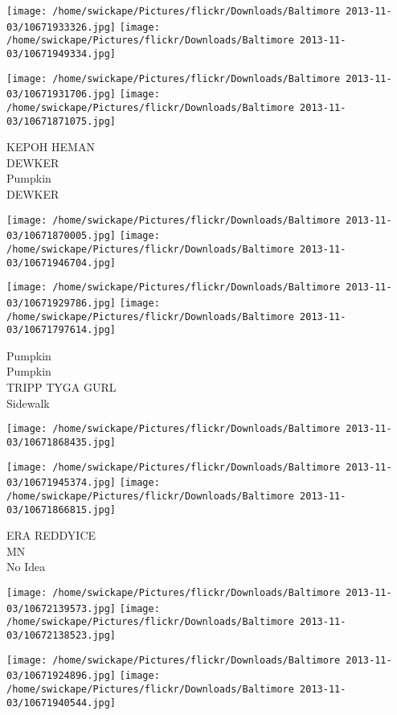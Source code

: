 \documentclass[10pt,letterpaper]{article}
\begin{document}
\texttt{[image: /home/swickape/Pictures/flickr/Downloads/Baltimore 2013-11-03/10671933326.jpg]}
\texttt{[image: /home/swickape/Pictures/flickr/Downloads/Baltimore 2013-11-03/10671949334.jpg]}

\texttt{[image: /home/swickape/Pictures/flickr/Downloads/Baltimore 2013-11-03/10671931706.jpg]}
\texttt{[image: /home/swickape/Pictures/flickr/Downloads/Baltimore 2013-11-03/10671871075.jpg]}

KEPOH HEMAN\\
DEWKER\\
Pumpkin\\
DEWKER\\
\pagebreak

\texttt{[image: /home/swickape/Pictures/flickr/Downloads/Baltimore 2013-11-03/10671870005.jpg]}
\texttt{[image: /home/swickape/Pictures/flickr/Downloads/Baltimore 2013-11-03/10671946704.jpg]}

\texttt{[image: /home/swickape/Pictures/flickr/Downloads/Baltimore 2013-11-03/10671929786.jpg]}
\texttt{[image: /home/swickape/Pictures/flickr/Downloads/Baltimore 2013-11-03/10671797614.jpg]}

Pumpkin\\
Pumpkin\\
TRIPP TYGA GURL\\
Sidewalk\\
\pagebreak

\texttt{[image: /home/swickape/Pictures/flickr/Downloads/Baltimore 2013-11-03/10671868435.jpg]}

\vspace{0.25in}
\texttt{[image: /home/swickape/Pictures/flickr/Downloads/Baltimore 2013-11-03/10671945374.jpg]}
\texttt{[image: /home/swickape/Pictures/flickr/Downloads/Baltimore 2013-11-03/10671866815.jpg]}

ERA REDDYICE\\
MN\\
No Idea\\
\pagebreak

\texttt{[image: /home/swickape/Pictures/flickr/Downloads/Baltimore 2013-11-03/10672139573.jpg]}
\texttt{[image: /home/swickape/Pictures/flickr/Downloads/Baltimore 2013-11-03/10672138523.jpg]}

\texttt{[image: /home/swickape/Pictures/flickr/Downloads/Baltimore 2013-11-03/10671924896.jpg]}
\texttt{[image: /home/swickape/Pictures/flickr/Downloads/Baltimore 2013-11-03/10671940544.jpg]}
\end{document}

